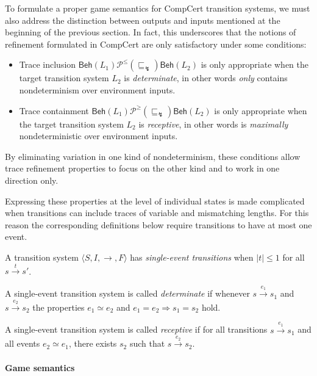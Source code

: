 \documentclass[sigplan,10pt,review,anonymous]{acmart}
\newcommand{\kw}[1]{\ensuremath{ \mathsf{#1} }}
\newcommand{\refby}{\sqsubseteq}
\begin{document}
To formulate a proper game semantics for
CompCert transition systems,
we must also address the distinction between
outputs and inputs mentioned
at the beginning of the previous section.
In fact,
this underscores that
the notions of refinement
formulated in CompCert
are only satisfactory under some conditions:
\begin{itemize}
  \item
    Trace inclusion
    $\kw{Beh}(L_1)
     \mathrel{\mathcal{P}^\le(\refby_\lightning)}
     \kw{Beh}(L_2)$
    is only appropriate when
    the target transition system $L_2$
    is \emph{determinate},
    in other words \emph{only} contains nondeterminism
    over environment inputs.
  \item
    Trace containment
    $\kw{Beh}(L_1)
     \mathrel{\mathcal{P}^\ge(\refby_\lightning)}
     \kw{Beh}(L_2)$
    is only appropriate when
    the target transition system $L_2$
    is \emph{receptive},
    in other words is \emph{maximally} nondeterministic
    over environment inputs.
\end{itemize}
By eliminating variation in one kind of nondeterminism,
these conditions allow trace refinement properties
to focus on the other kind
and to work in one direction only.

Expressing these properties at the level of individual states
is made complicated when transitions can include
traces of variable and mismatching lengths.
For this reason the corresponding definitions below
require transitions to have at most one event.

\begin{definition} %
A transition system
$\langle S, I, {\rightarrow}, F \rangle$
has \emph{single-event transitions}
when $|t| \le 1$ for all $s \stackrel{t}{\rightarrow} s'$.

A single-event transition system is called
\emph{determinate}
if whenever
$s \stackrel{e_1}{\longrightarrow} s_1$ and
$s \stackrel{e_2}{\longrightarrow} s_2$
the properties $e_1 \simeq e_2$ and $e_1 = e_2 \Rightarrow s_1 = s_2$ hold.

A single-event transition system is called
\emph{receptive}
if for all transitions $s \stackrel{e_1}{\longrightarrow} s_1$
and all events $e_2 \simeq e_1$,
there exists $s_2$ such that
$s \stackrel{e_2}{\longrightarrow} s_2$.
\end{definition}

\paragraph{Game semantics}
\end{document}
